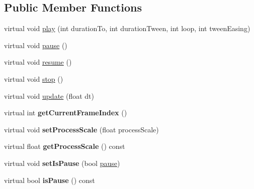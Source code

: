 \subsection*{Public Member Functions}
\begin{DoxyCompactItemize}
\item 
virtual void \hyperlink{classcocostudio_1_1ProcessBase_a96ae031da46adb39e75e50ef8cbfa1a3}{play} (int duration\+To, int duration\+Tween, int loop, int tween\+Easing)
\item 
virtual void \hyperlink{classcocostudio_1_1ProcessBase_a637a84b4d12652a27ce0465c9f805730}{pause} ()
\item 
virtual void \hyperlink{classcocostudio_1_1ProcessBase_a4e1927ae31e52d92b976b41229160f70}{resume} ()
\item 
virtual void \hyperlink{classcocostudio_1_1ProcessBase_a1bc5907ac5300d031f2a3ab6d1ed2718}{stop} ()
\item 
virtual void \hyperlink{classcocostudio_1_1ProcessBase_acd596d27542d92de41e3435add6f7399}{update} (float dt)
\item 
\mbox{\label{classcocostudio_1_1ProcessBase_a5f0e86b92b601f4cfd0ac922b8f6ddce}} 
virtual int {\bfseries get\+Current\+Frame\+Index} ()
\item 
\mbox{\label{classcocostudio_1_1ProcessBase_a87c877d0c89e7f2c0d9111936cfed7f5}} 
virtual void {\bfseries set\+Process\+Scale} (float process\+Scale)
\item 
\mbox{\label{classcocostudio_1_1ProcessBase_a30e266bee4cb76c52cf50894b31fb235}} 
virtual float {\bfseries get\+Process\+Scale} () const
\item 
\mbox{\label{classcocostudio_1_1ProcessBase_a2623100054eb624c68267df16962d76f}} 
virtual void {\bfseries set\+Is\+Pause} (bool \hyperlink{classcocostudio_1_1ProcessBase_a637a84b4d12652a27ce0465c9f805730}{pause})
\item 
\mbox{\label{classcocostudio_1_1ProcessBase_a49b621e1e4afb616ad0513c5a5cad67f}} 
virtual bool {\bfseries is\+Pause} () const
\item 
\mbox{\label{classcocostudio_1_1ProcessBase_a30dac8f16d48579820b028d0f29a02c8}} 

\end{DoxyCompactItemize}
